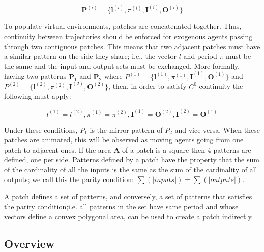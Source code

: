\begin{equation}
	\mathbf{P}^{(i)} = \{\mathbf{l}^{(i)}, \pi^{(i)}, \mathbf{I}^{(i)}, \mathbf{O}^{(i)}\}
\end{equation}

To populate virtual environments, patches are concatenated together.
Thus, continuity between trajectories should be enforced for exogenous agents passing through two contiguous patches.
This means that two adjacent patches must have a similar pattern on the side they share; i.e., the vector $l$ and period $\pi$ must be the same and the input and output sets must be exchanged.
More formally, having two patterns $\mathbf{P}_1$ and $\mathbf{P}_2$ where
$P^{(1)}=\{\mathbf{l}^{(1)}, \pi^{(1)}, \mathbf{I}^{(1)}, \mathbf{O}^{(1)}\}$ and~
$P^{(2)}=\{\mathbf{l}^{(2)}, \pi^{(2)}, \mathbf{I}^{(2)}, \mathbf{O}^{(2)}\}$, then, in order to satisfy $C^0$ continuity the following must apply:

\begin{equation}
	l^{(1)}=l^{(2)}, \pi^{(1)}=\pi^{(2)}, \mathbf{I}^{(1)} = \mathbf{O}^{(2)}, \mathbf{I}^{(2)} = \mathbf{O}^{(1)}
\end{equation}

Under these conditions, $P_1$ is the mirror pattern of $P_2$ and vice versa.
When these patches are animated, this will be observed as moving agents going from one patch to adjacent ones. 
If the area $\mathbf{A}$ of a patch is a square then 4 patterns are defined, one per side.
Patterns defined by a patch have the property that the sum of the cardinality of all the inputs is the same as the sum of the cardinality of all outputs; we call this the parity condition: $\sum(|inputs|)= \sum(|outputs|)$.

A patch defines a set of patterns, and conversely, a set of patterns that satisfies the parity condition;i.e. all patterns in the set have same period and whose vectors define a convex polygonal area, can be used to create a patch indirectly.

% 

\subsection{Overview}
\label{sec:method:overview}

